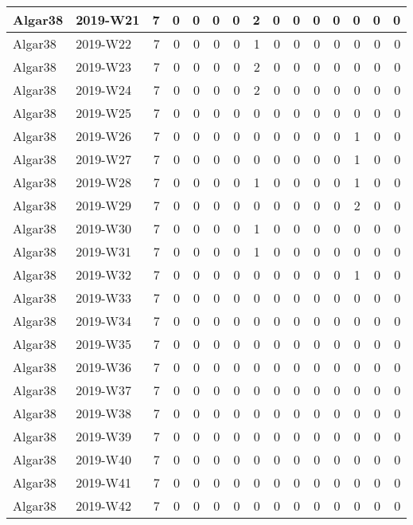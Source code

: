 \documentclass[]{book}
\begin{document}
\begin{table}
\begin{tabular}[t]{l|l|r|r|r|r|r|r|r|r|r|r|r|r|r}
\hline
Algar38 & 2019-W21 & 7 & 0 & 0 & 0 & 0 & 2 & 0 & 0 & 0 & 0 & 0 & 0 & 0\\
\hline
Algar38 & 2019-W22 & 7 & 0 & 0 & 0 & 0 & 1 & 0 & 0 & 0 & 0 & 0 & 0 & 0\\
\hline
Algar38 & 2019-W23 & 7 & 0 & 0 & 0 & 0 & 2 & 0 & 0 & 0 & 0 & 0 & 0 & 0\\
\hline
Algar38 & 2019-W24 & 7 & 0 & 0 & 0 & 0 & 2 & 0 & 0 & 0 & 0 & 0 & 0 & 0\\
\hline
Algar38 & 2019-W25 & 7 & 0 & 0 & 0 & 0 & 0 & 0 & 0 & 0 & 0 & 0 & 0 & 0\\
\hline
Algar38 & 2019-W26 & 7 & 0 & 0 & 0 & 0 & 0 & 0 & 0 & 0 & 0 & 1 & 0 & 0\\
\hline
Algar38 & 2019-W27 & 7 & 0 & 0 & 0 & 0 & 0 & 0 & 0 & 0 & 0 & 1 & 0 & 0\\
\hline
Algar38 & 2019-W28 & 7 & 0 & 0 & 0 & 0 & 1 & 0 & 0 & 0 & 0 & 1 & 0 & 0\\
\hline
Algar38 & 2019-W29 & 7 & 0 & 0 & 0 & 0 & 0 & 0 & 0 & 0 & 0 & 2 & 0 & 0\\
\hline
Algar38 & 2019-W30 & 7 & 0 & 0 & 0 & 0 & 1 & 0 & 0 & 0 & 0 & 0 & 0 & 0\\
\hline
Algar38 & 2019-W31 & 7 & 0 & 0 & 0 & 0 & 1 & 0 & 0 & 0 & 0 & 0 & 0 & 0\\
\hline
Algar38 & 2019-W32 & 7 & 0 & 0 & 0 & 0 & 0 & 0 & 0 & 0 & 0 & 1 & 0 & 0\\
\hline
Algar38 & 2019-W33 & 7 & 0 & 0 & 0 & 0 & 0 & 0 & 0 & 0 & 0 & 0 & 0 & 0\\
\hline
Algar38 & 2019-W34 & 7 & 0 & 0 & 0 & 0 & 0 & 0 & 0 & 0 & 0 & 0 & 0 & 0\\
\hline
Algar38 & 2019-W35 & 7 & 0 & 0 & 0 & 0 & 0 & 0 & 0 & 0 & 0 & 0 & 0 & 0\\
\hline
Algar38 & 2019-W36 & 7 & 0 & 0 & 0 & 0 & 0 & 0 & 0 & 0 & 0 & 0 & 0 & 0\\
\hline
Algar38 & 2019-W37 & 7 & 0 & 0 & 0 & 0 & 0 & 0 & 0 & 0 & 0 & 0 & 0 & 0\\
\hline
Algar38 & 2019-W38 & 7 & 0 & 0 & 0 & 0 & 0 & 0 & 0 & 0 & 0 & 0 & 0 & 0\\
\hline
Algar38 & 2019-W39 & 7 & 0 & 0 & 0 & 0 & 0 & 0 & 0 & 0 & 0 & 0 & 0 & 0\\
\hline
Algar38 & 2019-W40 & 7 & 0 & 0 & 0 & 0 & 0 & 0 & 0 & 0 & 0 & 0 & 0 & 0\\
\hline
Algar38 & 2019-W41 & 7 & 0 & 0 & 0 & 0 & 0 & 0 & 0 & 0 & 0 & 0 & 0 & 0\\
\hline
Algar38 & 2019-W42 & 7 & 0 & 0 & 0 & 0 & 0 & 0 & 0 & 0 & 0 & 0 & 0 & 0\\

\end{tabular}
\end{table}
\end{document}
